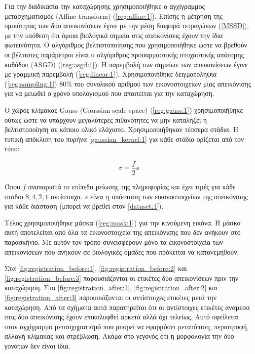 \documentclass[a4paper,12pt]{article}
\begin{document}
Για την διαδικασία την καταχώρησης χρησιμοποιήθηκε ο αγχίγραμμος μετασχηματισμός
(Affine transform) (\ref{reg:affine:1}). Επίσης η μέτρηση της ομοιότητας των δύο
απεικονίσεων έγινε με την μέση διαφορά τετραγώνων (\ref{MSSD}), με την υπόθεση
ότι όμοια βιολογικά σημεία στις απεικονίσεις έχουν την ίδια φωτεινότητα. Ο
αλγόριθμος βελτιστοποίησης που χρησιμοποιήθηκε ώστε να βρεθούν οι βέλτιστες
παράμετροι είναι ο αλγόριθμος προσαρμοστικής στοχαστικής απότομης καθόδου
(ASGD) (\ref{reg:asgd:1}). Η παρεμβολή των σημείων των απεικονίσεων έγινε με
γραμμική παρεμβολή (\ref{reg:linear:1}).  Χρησιμοποιήθηκε δειγματοληψία
(\ref{reg:sampling:1}) $80\%$ του συνολικού αριθμού των εικονοστοιχείων μίας
απεικόνισης για να μειωθεί ο χρόνο υπολογισμού που απαιτείται για την
καταχώρηση.

Ο χώρος κλίμακας Gauss (Gaussian scale-space) (\ref{reg:gauss:1})
χρησιμοποιήθηκε ούτως ώστε να υπάρχουν μεγαλύτερες πιθανότητες να μην καταλήξει
η βελτιστοποίηση σε κάποιο ολικό ελάχιστο. Χρησιμοποιήθηκαν τέσσερα στάδια. Η
τυπική απόκλιση του πυρήνα \eqref{gaussian_kernel:1} για κάθε στάδιο ορίζεται
από τον τύπο:

\begin{equation} \label{standard_deviation:1}
    \sigma = \frac {f} {2} s
\end{equation}

Όπου $f$ αναπαριστά το επίπεδο μείωσης της πληροφορίας και έχει τιμές για κάθε
στάδιο $8,4,2,1$ αντίστοιχα. $s$ είναι η απόσταση των εικονοστοιχείων της
απεικόνισης για κάθε διάσταση (μπορεί να βρεθεί στον \autoref{dataset:1}).

Τέλος χρησιμοποιήθηκε μάσκα (\ref{reg:mask:1}) για την κινούμενη εικόνα. Η μάσκα
αυτή αποτελείται από όλα τα εικονοστοιχεία της απεικόνισης που δεν ανήκουν στο
παρασκήνιο. Με αυτόν τον τρόπο συνεισφέρουν μόνο τα εικονοστοιχεία των
απεικονίσεων που ανήκουν σε βιολογικές ομάδες που πρόκειται να κατανεμηθούν.

Στα \autoref{fig:registration_before:1}, \autoref{fig:registration_before:2} και
\autoref{fig:registration_before:3} παρουσιάζονται οι ετικέτες δύο απεικονίσεων
πριν την καταχώρηση. Στα \autoref{fig:registration_after:1},
\autoref{fig:registration_after:2} και \autoref{fig:registration_after:3}
παρουσιάζονται οι αντίστοιχες ετικέτες μετά την καταχώρηση. Από τα σχήματα αυτά
παρατηρείται ότι οι αντίστοιχες ετικέτες ανάμεσα στις δύο απεικόνισης έχουν
επικαλυφθεί αρκετά αλλά όχι τελείως. Αυτό οφείλεται στον αγχίγραμμο
μετασχηματισμό που μπορεί να εφαρμόσει μετατόπιση, περιστροφή, αλλαγή κλίμακας
και στρέβλωση. Ακόμα στο γεγονός ότι η μορφολογία την δύο γονάτων δεν είναι
ίδια.
\end{document}
